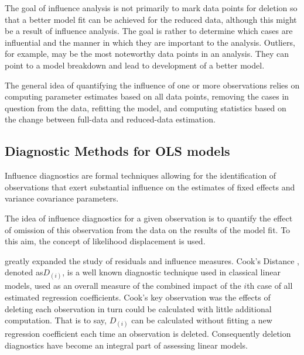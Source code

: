 \documentclass[12pt, a4paper]{report}
\theoremstyle{plain}
\theoremstyle{definition}
\theoremstyle{remark}
\begin{document}
		
		The goal of influence analysis is not primarily to mark data
		points for deletion so that a better model fit can be achieved for the reduced data, although this might be a
		result of influence analysis. The goal is rather to determine which cases are influential and the manner in
		which they are important to the analysis. Outliers, for example, may be the most noteworthy data points in
		an analysis. They can point to a model breakdown and lead to development of a better model.
		
		
		The general idea of quantifying the influence of one or more observations relies on computing parameter estimates based on all data points, removing the cases in question from the data, refitting the model, and computing statistics based on the change between full-data and reduced-data estimation. 
		
		\subsection{Diagnostic Methods for OLS models}
		Influence diagnostics are formal techniques allowing for the identification of observations that exert substantial 
		influence on the estimates of fixed effects and variance covariance parameters. 
		
		The idea of influence diagnostics for a given observation is to quantify the effect of omission of this observation 
		from the data on the results of the model fit. To this aim, the concept of likelihood displacement is used. 
		
		
		
		\citet{cook77} greatly expanded the study of residuals and influence measures. Cook's Distance , denoted as$D_{(i)}$, is a well known diagnostic technique used in classical linear models, used as an overall measure of the combined impact of the $i$th case of all estimated regression coefficients. Cook's key observation was the effects of deleting each observation in turn could be calculated with little additional computation. That is to say, $D_{(i)}$ can be calculated without fitting a new regression coefficient each time an observation is deleted.  Consequently deletion diagnostics have become an integral part of assessing linear models. 
		
\end{document}
